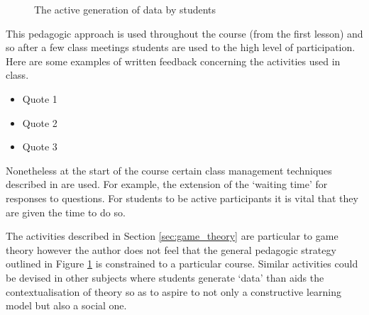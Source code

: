 \documentclass{article}
\begin{document}
\begin{figure}[!hbtp]
    \centering
    \caption{The active generation of data by students}
    \label{fig:use_of_data}
\end{figure}

This pedagogic approach is used throughout the course (from the first lesson)
and so after a few class meetings students are used to the high level of
participation. Here are some examples of written feedback concerning the
activities used in class.

\begin{itemize}
    \item Quote 1
    \item Quote 2
    \item Quote 3
\end{itemize}

Nonetheless at the start of the course certain class management
techniques described in \cite{Rocca2010} are used. For example, the extension of
the `waiting time' for responses to questions. For students to be active
participants it is vital that they are given the time to do so.


The activities described in Section \ref{sec:game_theory} are particular to game
theory however the author does not feel that the general pedagogic strategy
outlined in Figure \ref{fig:use_of_data} is constrained to a particular course.
Similar activities could be devised in other subjects where students generate
`data' than aids the contextualisation of theory so as to aspire to not only a
constructive learning model but also a social one.

\printbibliography
\end{document}
